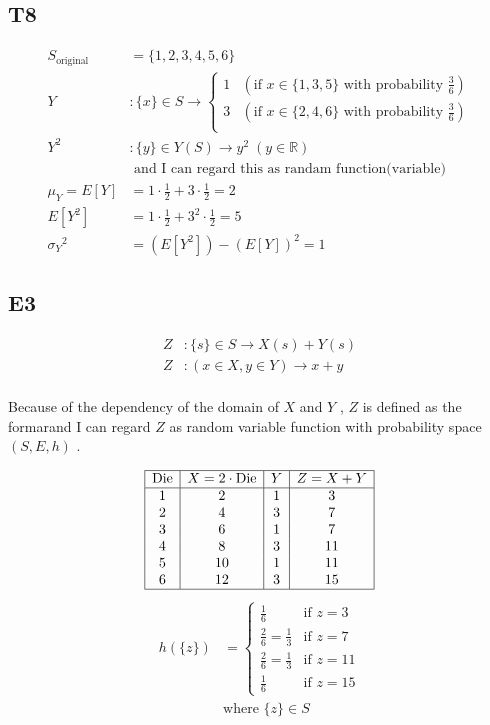\documentclass[12pt, a4paper]{article}
\begin{document}
\subsection* {T8}
\begin{align*}
S_\text{original} &=  \{ 1,2,3,4,5,6 \}  \\
Y &: \{ x \} \in S \rightarrow \begin{cases} 
1 & (\text{if } x \in \{ 1,3,5 \} \text{ with probability } \frac{3}{6} ) \\ 
3 & (\text{if } x \in \{ 2,4,6 \}  \text{ with probability } \frac{3}{6} )  \\
\end{cases} \\[0.5em]
Y^2 &: \{ y \} \in Y(S) \rightarrow y^2 \; (y \in \mathbb{R})  \\
	& \text{ and I can regard this as randam function(variable)  } \\
	\mu_Y = E[Y] &=  1 \cdot \frac{1}{2} + 3 \cdot \frac{1}{2} = 2 \\ 
E[ Y^2 ] &= 1 \cdot \frac{1}{2} + 3^2 \cdot  \frac{1}{2} = 5 \\
{\sigma_Y}^2 &= (E[Y^2]) - (E[Y])^2 = 1
\end{align*}


\subsection* {E3}

\begin{align*}
Z &: \{ s \} \in S \rightarrow X(s) + Y(s) \\
Z &: (x \in X, y \in Y) \rightarrow x + y \\
\end{align*}

Because of the dependency of the domain of $X$ and $Y$ , $Z$ is defined as the formarand I can regard $Z$ as random variable function with probability space $(S, E, h)$ .

\begin{equation*}
\begin{array}{|c|c|c|c|}
\hline
\text{Die}  & X = 2 \cdot \text{Die} & Y & Z = X + Y \\
\hline
1 &  2 & 1 & 3 \\
2 &  4 & 3 & 7 \\
3 & 6 & 1 & 7 \\
4 &  8 & 3 & 11 \\
5 & 10 & 1 & 11 \\
6 &  12 & 3 & 15 \\
\hline
\end{array}
\end{equation*}
\begin{align*}
h(\{z\}) &= \begin{cases}
\frac{1}{6} & \text{if } z = 3 \\
\frac{2}{6} = \frac{1}{3} & \text{if } z = 7 \\
\frac{2}{6} = \frac{1}{3} & \text{if } z = 11 \\
\frac{1}{6} & \text{if } z = 15
\end{cases} \\
&\text{where } \{z\} \in S
\end{align*}
\end{document}
